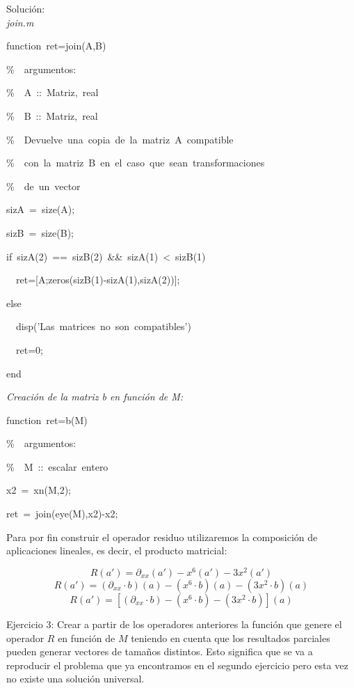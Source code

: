 Solución:\\
\emph{join.m}

\begin{lyxcode}
function~ret=join(A,B)



\%~~argumentos:

\%~~A~::~Matriz,~real

\%~~B~::~Matriz,~real

\%~~Devuelve~una~copia~de~la~matriz~A~compatible

\%~~con~la~matriz~B~en~el~caso~que~sean~transformaciones

\%~~de~un~vector



sizA~=~size(A);

sizB~=~size(B);

if~sizA(2)~==~sizB(2)~\&\&~sizA(1)~<~sizB(1)

~~ret={[}A;zeros(sizB(1)-sizA(1),sizA(2))];

else

~~disp('Las~matrices~no~son~compatibles')

~~ret=0;

end
\end{lyxcode}
\emph{Creación de la matriz b en función de M:}

\begin{lyxcode}
function~ret=b(M)

\%~~argumentos:

\%~~M~::~escalar~entero

x2~=~xn(M,2);

ret~=~join(eye(M),x2)-x2;
\end{lyxcode}
\lyxline{\normalsize}

Para por fin construir el operador residuo utilizaremos la composición
de aplicaciones lineales, es decir, el producto matricial:

\[
R(a')=\partial_{xx}(a')-x^{6}(a')-3x^{2}(a')\]
\[
R(a')=(\partial_{xx}\cdot b)(a)-(x^{6}\cdot b)(a)-(3x^{2}\cdot b)(a)\]
\[
R(a')=\left[(\partial_{xx}\cdot b)-(x^{6}\cdot b)-(3x^{2}\cdot b)\right](a)\]


\lyxline{\normalsize}

Ejercicio 3: Crear a partir de los operadores anteriores la función
que genere el operador $R$ en función de $M$ teniendo en cuenta
que los resultados parciales pueden generar vectores de tamaños distintos.
Esto significa que se va a reproducir el problema que ya encontramos
en el segundo ejercicio pero esta vez no existe una solución universal.

